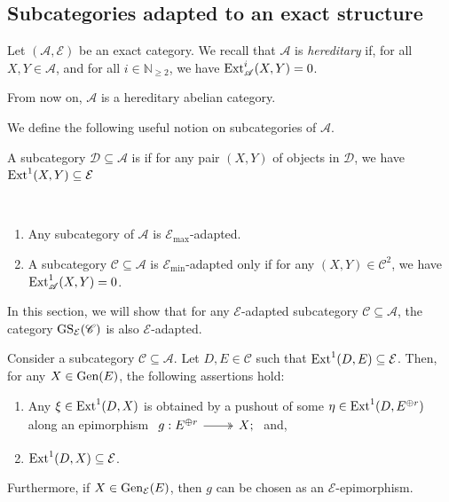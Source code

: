 \subsection{Subcategories adapted to an exact structure}
\label{ss:Adaptpreserv} Let $(\mathscr{A},\mathcal{E})$ be an exact category. We recall that $\mathscr{A}$ is \emph{hereditary} if, for all $X,Y \in \mathscr{A}$, and for all $i \in \mathbb{N}_{\geqslant 2}$, we have $\operatorname{Ext}_\mathscr{A}^i(X,Y) = 0$. 

\begin{conv} \label{conv:hereditary}
    From now on, $\mathscr{A}$ is a hereditary abelian category.
\end{conv}

We define the following useful notion on subcategories of $\mathscr{A}$.

\begin{definition} \label{def:Eadpted}
    A subcategory $\mathscr{D} \subseteq \mathscr{A}$ is  if for any pair $(X,Y)$ of objects in $\mathscr{D}$, we have $\operatorname{Ext}^1(X,Y) \subseteq \mathcal{E}$
\end{definition}
\begin{example} $ $
\begin{enumerate}[label=$\bullet$, itemsep=1mm]
    \item Any subcategory of $\mathscr{A}$ is $\mathcal{E}_{\max}$-adapted.
    \item A subcategory $\mathscr{C} \subseteq \mathscr{A}$ is $\mathcal{E}_{\min}$-adapted only if for any $(X,Y) \in \mathscr{C}^2$, we have $\operatorname{Ext}_\mathscr{A}^1 (X,Y) = 0$.
\end{enumerate}
\end{example}

In this section, we will show that for any $\mathcal{E}$-adapted subcategory $\mathscr{C} \subseteq \mathscr{A}$, the category $\operatorname{GS}_\mathcal{E}(\mathscr{C})$ is also $\mathcal{E}$-adapted.

\begin{lemma}
\label{lem:GenlocalEadapt}
Consider a subcategory $\mathscr{C} \subseteq \mathscr{A}$. Let $D,E \in \mathscr{C}$ such that $\operatorname{Ext}^1(D,E) \subseteq \mathcal{E}$. Then, for any $X \in \operatorname{Gen}(E)$, the following assertions hold:
\begin{enumerate}[label=$(\alph*)$,itemsep=1mm]
   \item Any $\xi \in \operatorname{Ext}^1(D,X)$ is obtained by a pushout of some $\eta \in \operatorname{Ext}^1(D,E^{\oplus r})$ along an epimorphism $ \begin{tikzcd}
	 g : E^{\oplus r} & X;
	\arrow[two heads,from=1-1, to=1-2]
   \end{tikzcd}$ and,
   \item $\operatorname{Ext}^1(D,X) \subseteq \mathcal{E}$.
\end{enumerate}
Furthermore, if $X \in \operatorname{Gen}_\mathcal{E}(E)$, then $g$ can be chosen as an $\mathcal{E}$-epimorphism.   
\end{lemma}

